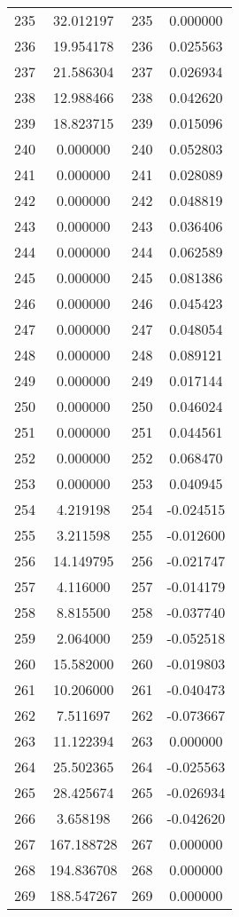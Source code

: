 \documentclass[12pt]{article}
\begin{document}
\begin{longtable}{@{}cccc@{}}
235 & 32.012197 & 235 & 0.000000 \\
236 & 19.954178 & 236 & 0.025563 \\
237 & 21.586304 & 237 & 0.026934 \\
238 & 12.988466 & 238 & 0.042620 \\
239 & 18.823715 & 239 & 0.015096 \\
240 & 0.000000 & 240 & 0.052803 \\
241 & 0.000000 & 241 & 0.028089 \\
242 & 0.000000 & 242 & 0.048819 \\
243 & 0.000000 & 243 & 0.036406 \\
244 & 0.000000 & 244 & 0.062589 \\
245 & 0.000000 & 245 & 0.081386 \\
246 & 0.000000 & 246 & 0.045423 \\
247 & 0.000000 & 247 & 0.048054 \\
248 & 0.000000 & 248 & 0.089121 \\
249 & 0.000000 & 249 & 0.017144 \\
250 & 0.000000 & 250 & 0.046024 \\
251 & 0.000000 & 251 & 0.044561 \\
252 & 0.000000 & 252 & 0.068470 \\
253 & 0.000000 & 253 & 0.040945 \\
254 & 4.219198 & 254 & -0.024515 \\
255 & 3.211598 & 255 & -0.012600 \\
256 & 14.149795 & 256 & -0.021747 \\
257 & 4.116000 & 257 & -0.014179 \\
258 & 8.815500 & 258 & -0.037740 \\
259 & 2.064000 & 259 & -0.052518 \\
260 & 15.582000 & 260 & -0.019803 \\
261 & 10.206000 & 261 & -0.040473 \\
262 & 7.511697 & 262 & -0.073667 \\
263 & 11.122394 & 263 & 0.000000 \\
264 & 25.502365 & 264 & -0.025563 \\
265 & 28.425674 & 265 & -0.026934 \\
266 & 3.658198 & 266 & -0.042620 \\
267 & 167.188728 & 267 & 0.000000 \\
268 & 194.836708 & 268 & 0.000000 \\
269 & 188.547267 & 269 & 0.000000 \\

\end{longtable}
\end{document}
